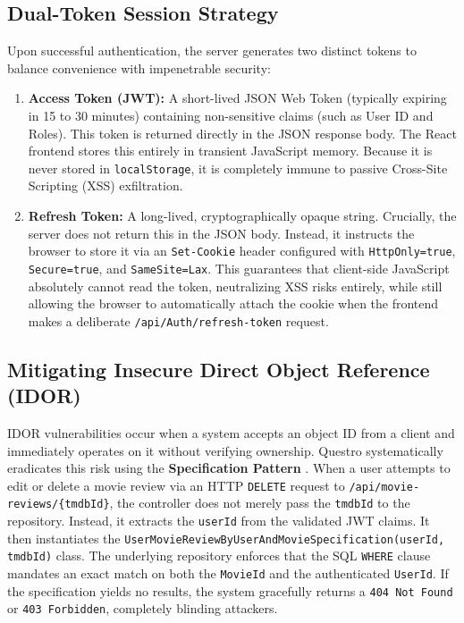 \subsection{Dual-Token Session Strategy}
Upon successful authentication, the server generates two distinct tokens to balance convenience with impenetrable security:
\begin{enumerate}
    \item \textbf{Access Token (JWT):} A short-lived JSON Web Token \cite{rfc7519} (typically expiring in 15 to 30 minutes) containing non-sensitive claims (such as User ID and Roles). This token is returned directly in the JSON response body. The React frontend stores this entirely in transient JavaScript memory. Because it is never stored in \texttt{localStorage}, it is completely immune to passive Cross-Site Scripting (XSS) exfiltration.
    \item \textbf{Refresh Token:} A long-lived, cryptographically opaque string. Crucially, the server does not return this in the JSON body. Instead, it instructs the browser to store it via an \texttt{Set-Cookie} header configured with \texttt{HttpOnly=true}, \texttt{Secure=true}, and \texttt{SameSite=Lax}. This guarantees that client-side JavaScript absolutely cannot read the token, neutralizing XSS risks entirely, while still allowing the browser to automatically attach the cookie when the frontend makes a deliberate \texttt{/api/Auth/refresh-token} request.
\end{enumerate}

\subsection{Mitigating Insecure Direct Object Reference (IDOR)}
IDOR vulnerabilities occur when a system accepts an object ID from a client and immediately operates on it without verifying ownership. Questro systematically eradicates this risk using the \textbf{Specification Pattern} \cite{evans2003ddd}.
When a user attempts to edit or delete a movie review via an HTTP \texttt{DELETE} request to \texttt{/api/movie-reviews/}\allowbreak\texttt{\{tmdbId\}}, the controller does not merely pass the \texttt{tmdbId} to the repository. Instead, it extracts the \texttt{userId} from the validated JWT claims. It then instantiates the \texttt{UserMovieReview}\allowbreak\texttt{ByUserAndMovie}\allowbreak\texttt{Specification}\allowbreak\texttt{(userId,}\allowbreak\texttt{ tmdbId)} class. The underlying repository enforces that the SQL \texttt{WHERE} clause mandates an exact match on both the \texttt{MovieId} and the authenticated \texttt{UserId}. If the specification yields no results, the system gracefully returns a \texttt{404 Not Found} or \texttt{403 Forbidden}, completely blinding attackers.


